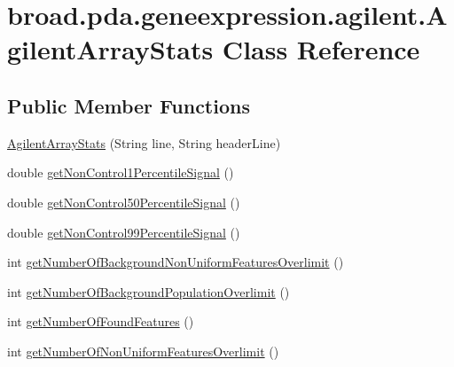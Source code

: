 \hypertarget{classbroad_1_1pda_1_1geneexpression_1_1agilent_1_1_agilent_array_stats}{\section{broad.\+pda.\+geneexpression.\+agilent.\+Agilent\+Array\+Stats Class Reference}
\label{classbroad_1_1pda_1_1geneexpression_1_1agilent_1_1_agilent_array_stats}
}
\subsection*{Public Member Functions}
\begin{DoxyCompactItemize}
\item 
\hyperlink{classbroad_1_1pda_1_1geneexpression_1_1agilent_1_1_agilent_array_stats_a486c076e5bbff19425b2bb6817103f48}{Agilent\+Array\+Stats} (String line, String header\+Line)
\item 
double \hyperlink{classbroad_1_1pda_1_1geneexpression_1_1agilent_1_1_agilent_array_stats_a2a9bff75bfd2b26eeab456b313cb6264}{get\+Non\+Control1\+Percentile\+Signal} ()
\item 
double \hyperlink{classbroad_1_1pda_1_1geneexpression_1_1agilent_1_1_agilent_array_stats_a1e4958b4239f5d8ac69f606376b47231}{get\+Non\+Control50\+Percentile\+Signal} ()
\item 
double \hyperlink{classbroad_1_1pda_1_1geneexpression_1_1agilent_1_1_agilent_array_stats_a6e40e5ea62b4d36df8ed8e37e82fabb4}{get\+Non\+Control99\+Percentile\+Signal} ()
\item 
int \hyperlink{classbroad_1_1pda_1_1geneexpression_1_1agilent_1_1_agilent_array_stats_aae400a7eb9325d900a5b8760f2a8a645}{get\+Number\+Of\+Background\+Non\+Uniform\+Features\+Overlimit} ()
\item 
int \hyperlink{classbroad_1_1pda_1_1geneexpression_1_1agilent_1_1_agilent_array_stats_aae25713abd84ba58b85fe5940ee6427b}{get\+Number\+Of\+Background\+Population\+Overlimit} ()
\item 
int \hyperlink{classbroad_1_1pda_1_1geneexpression_1_1agilent_1_1_agilent_array_stats_a62a9024ac1e09d46f264337a66186502}{get\+Number\+Of\+Found\+Features} ()
\item 
int \hyperlink{classbroad_1_1pda_1_1geneexpression_1_1agilent_1_1_agilent_array_stats_ab6bb263384208fefd612b57574a46291}{get\+Number\+Of\+Non\+Uniform\+Features\+Overlimit} ()
\item 

\end{DoxyCompactItemize}
